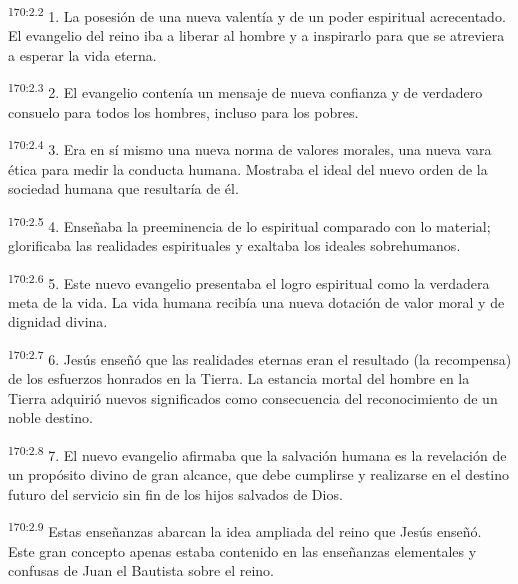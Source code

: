 \par 
\textsuperscript{170:2.2} 1. La posesión de una nueva valentía y de un poder espiritual acrecentado. El evangelio del reino iba a liberar al hombre y a inspirarlo para que se atreviera a esperar la vida eterna.

\par 
\textsuperscript{170:2.3} 2. El evangelio contenía un mensaje de nueva confianza y de verdadero consuelo para todos los hombres, incluso para los pobres.

\par 
\textsuperscript{170:2.4} 3. Era en sí mismo una nueva norma de valores morales, una nueva vara ética para medir la conducta humana. Mostraba el ideal del nuevo orden de la sociedad humana que resultaría de él.

\par 
\textsuperscript{170:2.5} 4. Enseñaba la preeminencia de lo espiritual comparado con lo material; glorificaba las realidades espirituales y exaltaba los ideales sobrehumanos.

\par 
\textsuperscript{170:2.6} 5. Este nuevo evangelio presentaba el logro espiritual como la verdadera meta de la vida. La vida humana recibía una nueva dotación de valor moral y de dignidad divina.

\par 
\textsuperscript{170:2.7} 6. Jesús enseñó que las realidades eternas eran el resultado (la recompensa) de los esfuerzos honrados en la Tierra. La estancia mortal del hombre en la Tierra adquirió nuevos significados como consecuencia del reconocimiento de un noble destino.

\par 
\textsuperscript{170:2.8} 7. El nuevo evangelio afirmaba que la salvación humana es la revelación de un propósito divino de gran alcance, que debe cumplirse y realizarse en el destino futuro del servicio sin fin de los hijos salvados de Dios.

\par 
\textsuperscript{170:2.9} Estas enseñanzas abarcan la idea ampliada del reino que Jesús enseñó. Este gran concepto apenas estaba contenido en las enseñanzas elementales y confusas de Juan el Bautista sobre el reino.

